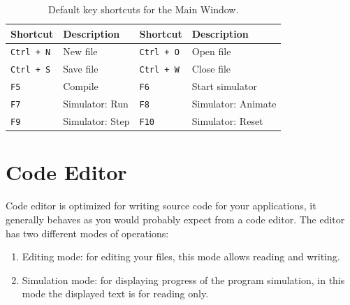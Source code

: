             \begin{table}[h!]
                \centering
                \fontsize{8pt}{9pt}
                {
                    \begin{tabular}{|l|l|l|l|}
                        \hline
                        \textbf{Shortcut}               & \textbf{Description}          &
                        \textbf{Shortcut}               & \textbf{Description}          \\\hline
                        \texttt{Ctrl + N}               & New file                      &
                        \texttt{Ctrl + O}               & Open file                     \\
                        \texttt{Ctrl + S}               & Save file                     &
                        \texttt{Ctrl + W}               & Close file                    \\
                        \texttt{F5}                     & Compile                       &
                        \texttt{F6}                     & Start simulator               \\
                        \texttt{F7}                     & Simulator: Run                &
                        \texttt{F8}                     & Simulator: Animate            \\
                        \texttt{F9}                     & Simulator: Step               &
                        \texttt{F10}                    & Simulator: Reset              \\
                        \hline
                    \end{tabular}
                }
                \caption{Default key shortcuts for the Main Window.}
            \end{table}

\clearpage
\section{Code Editor}
    Code editor is optimized for writing source code for your applications, it generally behaves as you would probably expect from a code editor. The editor has two different modes of operations:

    \begin{enumerate}
        \item Editing mode: for editing your files, this mode allows reading and writing.
        \item Simulation mode: for displaying progress of the program simulation, in this mode the displayed text is for reading only.
    \end{enumerate}

